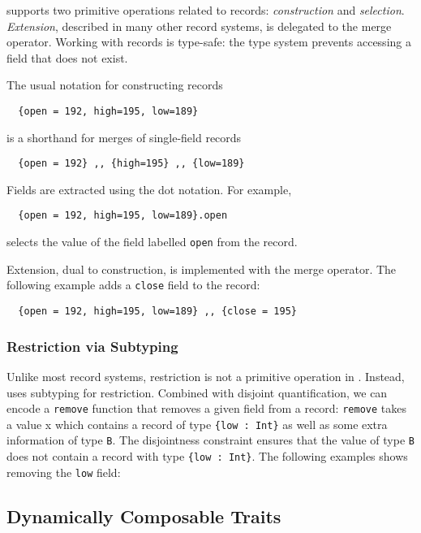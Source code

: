 \name supports two primitive operations related to records:
\textit{construction} and \textit{selection}. \textit{Extension}, described in
many other record systems, is delegated to the merge operator. Working with
records is type-safe: the type system prevents accessing a field that does not
exist.

The usual notation for constructing records
\begin{lstlisting}
  {open = 192, high=195, low=189}
\end{lstlisting}
is a shorthand for merges of single-field records
\begin{lstlisting}
  {open = 192} ,, {high=195} ,, {low=189}
\end{lstlisting}

Fields are extracted using the dot notation. For example,
\begin{lstlisting}
  {open = 192, high=195, low=189}.open
\end{lstlisting}
selects the value of the field labelled \lstinline{open} from the record.

Extension, dual to construction, is implemented with the merge operator. The
following example adds a \lstinline{close} field to the record:
\begin{lstlisting}
  {open = 192, high=195, low=189} ,, {close = 195}
\end{lstlisting}


\subsubsection{Restriction via Subtyping}

Unlike most record systems, restriction is not a primitive operation in \name.
Instead, \name uses subtyping for restriction. Combined with disjoint
quantification, we can encode a \lstinline{remove} function that removes a given
field from a record:
\lstinline{remove} takes a value x which contains a record of type
\lstinline${low : Int}$ as well as some extra information of type \lstinline{B}.
The disjointness constraint ensures that the value of type \lstinline{B} does
not contain a record with type \lstinline${low : Int}$. The following examples
shows removing the \lstinline{low} field:


\subsection{Dynamically Composable Traits}
\label{sec:traits}

